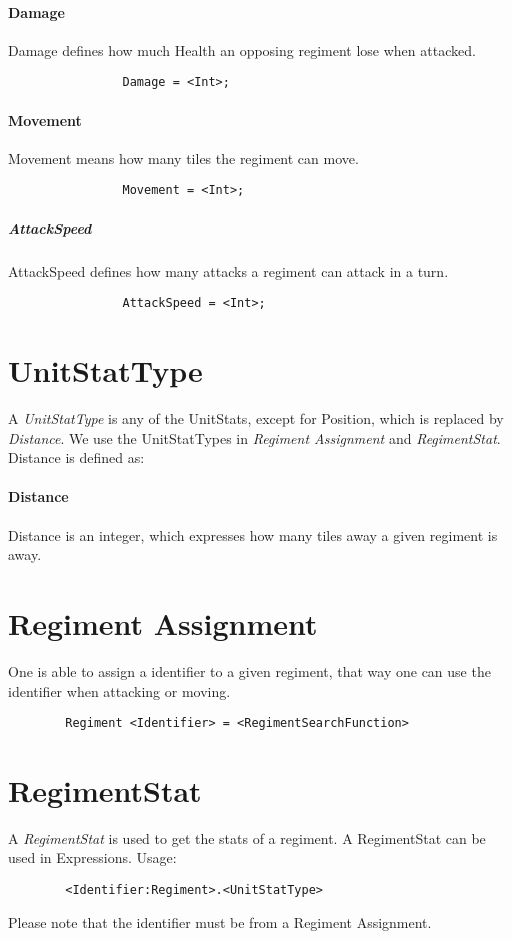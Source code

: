		\paragraph{Damage}
			Damage defines how much Health an opposing regiment lose when attacked.
			\begin{verbatim}
				Damage = <Int>;
			\end{verbatim}
		\paragraph{Movement}
			Movement means how many tiles the regiment can move.
			\begin{verbatim}
				Movement = <Int>;
			\end{verbatim}
		\subparagraph{AttackSpeed}
			AttackSpeed defines how many attacks a regiment can attack in a turn.
			\begin{verbatim}
				AttackSpeed = <Int>;
			\end{verbatim}

\section{UnitStatType}
	A {\it UnitStatType} is any of the UnitStats, except for Position, which is replaced by {\it Distance}. We use the UnitStatTypes in 
	{\it Regiment Assignment} and {\it RegimentStat}.
	Distance is defined as:
	\paragraph{Distance}
		Distance is an integer, which expresses how many tiles away a given regiment is away.

\section{Regiment Assignment}
\label{doc:regass}
	One is able to assign a identifier to a given regiment, that way one can use the identifier when attacking or moving.
	\begin{verbatim}
		Regiment <Identifier> = <RegimentSearchFunction>
	\end{verbatim}
\section{RegimentStat}
	A {\it RegimentStat} is used to get the stats of a regiment. A RegimentStat can be used in Expressions. Usage:\\
	\begin{verbatim}
		<Identifier:Regiment>.<UnitStatType>
	\end{verbatim}
	Please note that the identifier must be from a Regiment Assignment.


